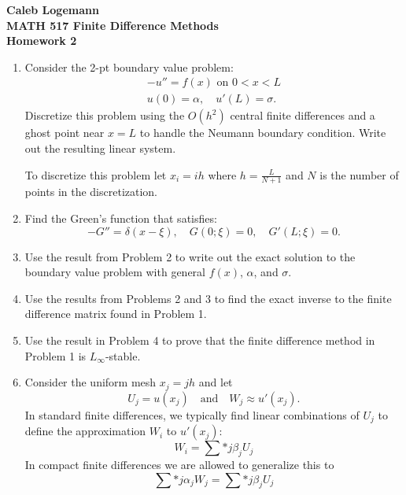\documentclass[11pt, oneside]{article}
\begin{document}
\noindent \textbf{\Large{Caleb Logemann \\
MATH 517 Finite Difference Methods \\
Homework 2
}}

%
\begin{enumerate}
    \item %
        Consider the 2-pt boundary value problem:
        \begin{align*}
            -u'' = f(x)\text{ on } 0 < x < L \\
            u(0) = \alpha, \quad u'(L) = \sigma.
        \end{align*}
        Discretize this problem using the $O(h^2)$ central finite differences
        and a ghost point near $x = L$ to handle the Neumann boundary condition.
        Write out the resulting linear system.

        To discretize this problem let $x_i = ih$ where $h = \frac{L}{N + 1}$
        and $N$ is the number of points in the discretization.

    \item %
        Find the Green's function that satisfies:
        \[
            -G'' = \delta(x - \xi),\quad G(0;\xi) = 0,\quad G'(L;\xi) = 0.
        \]

    \item %
        Use the result from Problem 2 to write out the exact solution to the
        boundary value problem with general $f(x)$, $\alpha$, and $\sigma$.

    \item %
        Use the results from Problems 2 and 3 to find the exact inverse to the
        finite difference matrix found in Problem 1.

    \item %
        Use the result in Problem 4 to prove that the finite difference method
        in Problem 1 is $L_{\infty}$-stable.

    \item %
        Consider the uniform mesh $x_j = jh$ and let
        \[
            U_j = u(x_j) \quad \text{and} \quad W_j \approx u'(x_j).
        \]
        In standard finite differences, we typically find linear combinations
        of $U_j$ to define the approximation $W_i$ to $u'(x_j)$:
        \[
            W_i = \sum*{j}{}{\beta_j U_j}
        \]
        In compact finite differences we are allowed to generalize this to
        \[
            \sum*{j}{}{\alpha_j W_j} = \sum*{j}{}{\beta_j U_j}
        \]


\end{enumerate}
\end{document}
